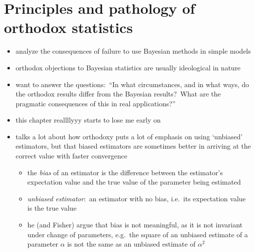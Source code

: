 \documentclass[../jaynes_prob_theory_notes.tex]{subfiles}
\begin{document}
    \section{Principles and pathology of orthodox statistics}
        \begin{itemize} 
            \item analyze the consequences of failure to use Bayesian methods in simple models
            \item orthodox objections to Bayesian statistics are usually ideological in nature
            \item want to answer the questions:\ ``In what circumstances, and in what ways, do the orthodox results differ from the Bayesian results?\ What are the pragmatic consequences of this in real applications?''
            \item this chapter reallllyyy starts to lose me early on
            \item talks a lot about how orthodoxy puts a lot of emphasis on using `unbiased' estimators, but that biased estimators are sometimes better in arriving at the correct value with faster convergence 
                \begin{itemize} 
                    \item the \textit{bias} of an estimator is the difference between the estimator's expectation value and the true value of the parameter being estimated
                    \item \textit{unbiased estimator}:\ an estimator with no bias, i.e.\ its expectation value is the true value
                    \item he (and Fisher) argue that bias is not meaningful, as it is not invariant under change of parameters, e.g.\ the square of an unbiased estimate of a parameter \(\alpha\) is not the same as an unbiased estimate of \(\alpha^2\)
                \end{itemize}
        \end{itemize}
\end{document}
